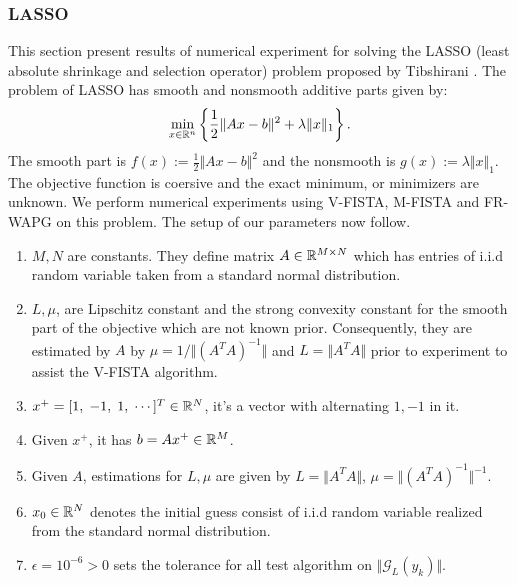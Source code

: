 \documentclass[12pt]{article}
\begin{document}
        \subsubsection{LASSO}
            This section present results of numerical experiment for solving the LASSO (least absolute shrinkage and selection operator) problem proposed by Tibshirani \cite{tibshirani_regression_1996}.
            The problem of LASSO has smooth and nonsmooth additive parts given by:
            \begin{align*}
                \min_{x \in \mathbb R^n}
                \left\lbrace
                    \frac{1}{2}\Vert Ax - b\Vert^2 + \lambda\Vert x\Vert_1
                \right\rbrace.
            \end{align*}
            The smooth part is $f(x) :=\frac{1}{2}\Vert Ax - b\Vert^2$ and the nonsmooth is $g(x) := \lambda\Vert x\Vert_1$.
            The objective function is coersive and the exact minimum, or minimizers are unknown.
            We perform numerical experiments using V-FISTA, M-FISTA and FR-WAPG on this problem.
            The setup of our parameters now follow.
            \begin{enumerate}
                \item $M, N$ are constants. They define matrix $A \in \mathbb R^{M\times N}$ which has entries of i.i.d random variable taken from a standard normal distribution.
                \item $L, \mu$, are Lipschitz constant and the strong convexity constant for the smooth part of the objective which are not known prior. Consequently, they are estimated by $A$ by $\mu = 1/\Vert (A^TA)^{-1}\Vert$ and $L = \Vert A^TA\Vert$ prior to experiment to assist the V-FISTA algorithm.
                \item $x^+ = [1,\; -1,\; 1, \; \cdots ]^T \in \mathbb R^N$, it's a vector with alternating $1, -1$ in it.
                \item Given $x^+$, it has $b = Ax^+ \in \mathbb R^M$.
                \item Given $A$, estimations for $L,\mu$ are given by $L = \Vert A^TA\Vert$, $\mu = \Vert (A^TA)^{-1}\Vert^{-1}$.
                \item $x_0\in \mathbb R^N$ denotes the initial guess consist of i.i.d random variable realized from the standard normal distribution.
                \item $\epsilon = 10^{-6} > 0$ sets the tolerance for all test algorithm on $\Vert \mathcal G_L(y_k)\Vert$.
            \end{enumerate}
\end{document}
